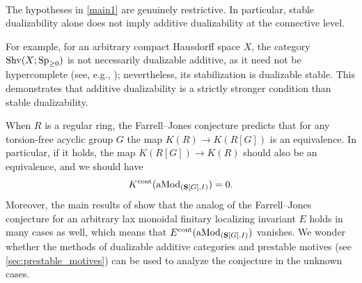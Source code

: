 \documentclass[a4paper,10pt, oneside]{amsart}
\begin{document}
	
		\begin{exam}\label{exm:top_exm}\,
	\end{exam}
	
	
\begin{rem}\label{counterexamdualstnotdualadd}
	The hypotheses in \cref{main1} are genuinely restrictive. In particular, stable dualizability alone does not imply additive dualizability at the connective level.
	
	For example, for an arbitrary compact Hausdorff space $X$, the category $\operatorname{Shv}(X;\operatorname{Sp}_{\geq0})$ is not necessarily  dualizable additive, as it need not be hypercomplete (see, e.g., \cite[Counterexample 6.5.4.8]{htt}); nevertheless, its stabilization is  dualizable stable. This demonstrates that additive dualizability is a strictly stronger condition than stable dualizability.
\end{rem}


	\begin{rem}
		When $R$ is a regular ring, the Farrell--Jones conjecture \cite[Section~1.6]{FarrellJones1993} predicts that for any torsion-free acyclic group $G$ the map $K(R) \to K(R[G])$ is an equivalence. 
		In particular, if it holds, the map $K(R[G]) \to K(R)$ should also be an equivalence, and we should have $$K^{\mathrm{cont}}(\operatorname{aMod}_{(\mathbf{S}[G],I)})=0.$$
		Moreover, the main results of \cite{BunkeKasprowskiWinges2026} show that the analog of the Farrell--Jones conjecture for an arbitrary lax monoidal finitary localizing invariant $E$ holds in many
		cases as well, which means that $E^{\mathrm{cont}}(\operatorname{aMod}_{(\mathbf{S}[G],I)})$ vanishes. We wonder whether the methods of dualizable additive categories and prestable motives 
		(see \cref{sec:prestable_motives}) can be used to analyze the conjecture in the unknown cases.
	\end{rem}
\end{document}
